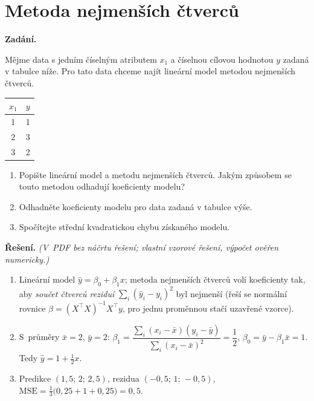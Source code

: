 \section{Metoda nejmenších čtverců}

\noindent\textbf{Zadání.}\par
Mějme data s jedním číselným atributem $x_1$ a číselnou cílovou hodnotou $y$ zadaná v tabulce níže.
Pro tato data chceme najít lineární model metodou nejmenších čtverců.

\begin{center}
\begin{tabular}{c|c}
\toprule
$x_1$ & $y$ \\
\midrule
1 & 1 \\
2 & 3 \\
3 & 2 \\
\bottomrule
\end{tabular}
\end{center}

\begin{enumerate}
  \item Popište lineární model a metodu nejmenších čtverců. Jakým způsobem se touto metodou
    odhadují koeficienty modelu?
  \item Odhadněte koeficienty modelu pro data zadaná v tabulce výše.
  \item Spočítejte střední kvadratickou chybu získaného modelu.
\end{enumerate}

\medskip
\noindent\textbf{Řešení.} \textit{(V~PDF bez náčrtu řešení; vlastní vzorové řešení, výpočet ověřen numericky.)}\par
\begin{enumerate}[nosep]
  \item Lineární model $\hat y=\beta_0+\beta_1 x$; metoda nejmenších čtverců volí koeficienty tak, aby \emph{součet čtverců reziduí} $\sum_i(\hat y_i-y_i)^2$ byl nejmenší (řeší se normální rovnice $\beta=(X^\top X)^{-1}X^\top y$, pro jednu proměnnou stačí uzavřené vzorce).
  \item S~průměry $\bar x=2$, $\bar y=2$: $\beta_1=\dfrac{\sum_i(x_i-\bar x)(y_i-\bar y)}{\sum_i(x_i-\bar x)^2}=\dfrac{1}{2}$, $\beta_0=\bar y-\beta_1\bar x=1$. Tedy $\hat y=1+\tfrac12 x$.
  \item Predikce $(1{,}5;\,2;\,2{,}5)$, rezidua $(-0{,}5;\,1;\,-0{,}5)$, $\mathrm{MSE}=\tfrac13\big(0{,}25+1+0{,}25\big)=0{,}5$.
\end{enumerate}
